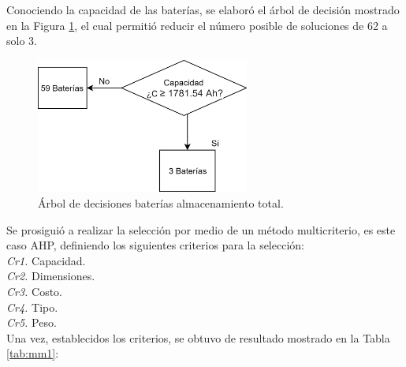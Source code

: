 Conociendo la capacidad de las baterías, se elaboró el árbol de decisión mostrado en la Figura \ref{fig:Arrutbat}, el cual permitió reducir el número posible de soluciones de 62 a solo 3.\\
\begin{figure}[H]
	\centering
	\includegraphics[width=7cm]{imagenes/Arrutabat}
	\caption{Árbol de decisiones baterías almacenamiento total.}
	\label{fig:Arrutbat}
\end{figure}

Se prosiguió a realizar la selección por medio de un método multicriterio, es este caso AHP, definiendo los siguientes criterios para la selección:\\
\hspace*{4em}\textit{Cr1.} Capacidad.\\
\hspace*{4em}\textit{Cr2.} Dimensiones.\\
\hspace*{4em}\textit{Cr3.} Costo.\\
\hspace*{4em}\textit{Cr4.} Tipo.\\
\hspace*{4em}\textit{Cr5.} Peso.\\
Una vez, establecidos los criterios, se obtuvo de resultado mostrado en la Tabla \ref{tab:mm1}:

